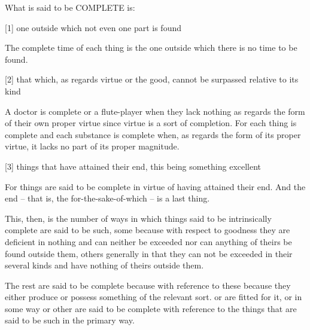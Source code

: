 
What is said to be COMPLETE is:

[1]     one outside which not even one part is found

        The complete time of each thing is the one outside which
        there is no time to be found.

[2]     that which, as regards virtue or the good, cannot be surpassed
        relative to its kind

        A doctor is complete or a flute-player when they lack nothing as regards
        the form of their own proper virtue since virtue is a sort of completion. 
        For each thing is complete and each substance is complete when,
        as regards the form of its proper virtue, it lacks no part of its proper magnitude.

[3]     things that have attained their end, this being something excellent

        For things are said to be complete in virtue of having attained their end.
        And the end -- that is, the for-the-sake-of-which -- is a last thing.

This, then, is the number of ways in which things said to be intrinsically complete
are said to be such, some because with respect to goodness they are deficient
in nothing and can neither be exceeded nor can anything of theirs be found
outside them, others generally in that they can not be exceeded in their
several kinds and have nothing of theirs outside them.

The rest are said to be complete because with reference to these
because they either produce or possess something of the relevant sort.
or are fitted for it, or in some way or other are said to be complete
with reference to the things that are said to be such in the primary way.
